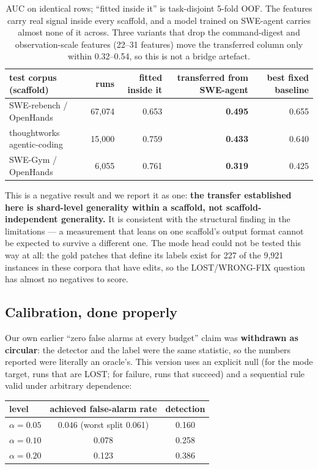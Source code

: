 \documentclass[10pt]{article}
\begin{document}
\begin{table}[h]
\centering\small
\begin{tabular}{lrrrr}
\toprule
test corpus (scaffold) & runs & fitted inside it & \textbf{transferred from SWE-agent} & best fixed baseline \\
\midrule
SWE-rebench / OpenHands & 67{,}074 & 0.653 & \textbf{0.495} & 0.655 \\
thoughtworks agentic-coding & 15{,}000 & 0.759 & \textbf{0.433} & 0.640 \\
SWE-Gym / OpenHands & 6{,}055 & 0.761 & \textbf{0.319} & 0.425 \\
\bottomrule
\end{tabular}
\caption{AUC on identical rows; ``fitted inside it'' is task-disjoint 5-fold OOF. The features
carry real signal inside every scaffold, and a model trained on SWE-agent carries almost none of it
across. Three variants that drop the command-digest and observation-scale features (22--31 features)
move the transferred column only within 0.32--0.54, so this is not a bridge artefact.}
\end{table}

\noindent This is a negative result and we report it as one: \textbf{the transfer established here
is shard-level generality within a scaffold, not scaffold-independent generality.} It is consistent
with the structural finding in the limitations --- a measurement that leans on one scaffold's output
format cannot be expected to survive a different one. The mode head could not be tested this way at
all: the gold patches that define its labels exist for 227 of the 9{,}921 instances in these corpora
that have edits, so the LOST/WRONG-FIX question has almost no negatives to score.

\subsection{Calibration, done properly}
Our own earlier ``zero false alarms at every budget'' claim was \textbf{withdrawn as circular}: the
detector and the label were the same statistic, so the numbers reported were literally an oracle's.
This version uses an explicit null (for the mode target, runs that are LOST; for failure, runs that
succeed) and a sequential rule valid under arbitrary dependence:

\begin{table}[h]
\centering\small
\begin{tabular}{lcc}
\toprule
level & achieved false-alarm rate & detection \\
\midrule
$\alpha = 0.05$ & $\mathbf{0.046}$ (worst split 0.061) & 0.160 \\
$\alpha = 0.10$ & 0.078 & 0.258 \\
$\alpha = 0.20$ & 0.123 & 0.386 \\
\bottomrule
\end{tabular}
\end{table}
\end{document}
